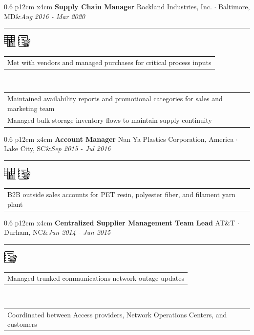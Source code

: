 \documentclass[10pt,A4]{article}
\newcommand{\tzlarrow}{(0,0) -- (0.2,0) -- (0.3,0.2) -- (0.2,0.4) -- (0,0.4) -- (0.1,0.2) -- cycle;}
\newcommand{\larrow}[1]
{\begin{tikzpicture}[scale=0.58]
	 \filldraw[fill=#1!100,draw=#1!100!black]  \tzlarrow
 \end{tikzpicture}
}
\newcommand{\cvevent}[5]
{
\vspace{8pt}
	\begin{tabular*}{0.6\linewidth}{ p{12cm} x{4cm}}
\textbf{#2} \hspace{4pt} {#3}&\textit{#1}\\[4pt]
	\end{tabular*}
        
        \vspace{-10pt}

\textcolor{softcol}{\hrule}
\vspace{-2pt}
\hspace{14.3cm}
#4 \\[-18pt-6pt]
\vspace{6pt}
	\begin{tabular*}{1\textwidth}{l}
	\vspace{-0.85cm} \larrow{sectcol} #5\\[4.5pt]
	\end{tabular*}
}
\newcommand{\cveventshort}[5]
{
\vspace{8pt}
	\begin{tabular*}{0.6\linewidth}{ p{12cm} x{4cm}}
\textbf{#2} \hspace{4pt} {#3}&\textit{#1}\\[4pt]
	\end{tabular*}
        
        \vspace{-10pt}
        
\textcolor{softcol}{\hrule}
\vspace{-2pt}
\hspace{14.3cm}
#4 \\[-18pt-6pt]
\vspace{6pt}
	\begin{tabular*}{1\textwidth}{l}
	\vspace{-0.85cm} \larrow{sectcol} #5\\[6pt]
	\end{tabular*}
\vspace{-3pt}
}
\newcommand{\oneextra}[1]
{ \vspace{-0.85cm+24pt} \\
\begin{tabular*}{1\textwidth}{l}
		 \larrow{softcol}  #1\\[6pt]
	\end{tabular*}
\vspace{-3pt}
}
\newcommand{\twoextra}[2]
{ \vspace{-0.85cm+24pt} \\
\begin{tabular*}{1\textwidth}{l}
		 \larrow{softcol}  #1\\[4.5pt]
		 \larrow{softcol}  #2\\[6pt]
	\end{tabular*}
\vspace{-3pt}
}
\begin{document}
\begin{minipage}[c][0.5\textheight][t]{\linewidth}
{%

%
  \cvevent{Aug 2016 - Mar 2020}{Supply Chain Manager}{Rockland Industries, Inc.  $\cdot$  Baltimore, MD}
{ \hspace{20.2222pt} \includegraphics[height=18pt]{img/chartgraphic} \hspace{2pt} \includegraphics[height=18pt]{img/notebookgraphic}}
{Met with vendors and managed purchases for critical process inputs}
  \twoextra{Maintained availability reports and promotional categories for sales and marketing team}{Managed bulk storage inventory flows to maintain supply continuity}


%
  \cveventshort{Sep 2015 - Jul 2016}{Account Manager}{Nan Ya Plastics Corporation, America  $\cdot$  Lake City, SC}
{ \hspace{20.2222pt} \includegraphics[height=18pt]{img/chartgraphic} \hspace{2pt} \includegraphics[height=18pt]{img/notebookgraphic}}
{B2B outside sales accounts for PET resin, polyester fiber, and filament yarn plant}



%
  \cvevent{Jun 2014 - Jun 2015}{Centralized Supplier Management Team Lead}{AT\&T  $\cdot$  Durham, NC}
{ \hspace{45.2222pt}  \includegraphics[height=18pt]{img/notebookgraphic}}
{Managed trunked communications network outage updates}
  \oneextra{Coordinated between Access providers, Network Operations Centers, and customers}
}

\end{minipage} \\ [24pt]
\end{document}
